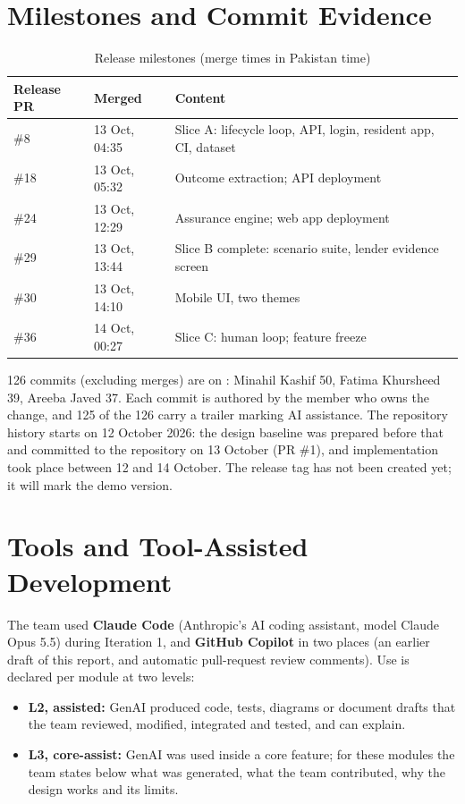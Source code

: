 \section{Milestones and Commit Evidence}\label{sec:milestones-commit-evidence}
\begin{table}[H]
\centering
\caption{Release milestones (merge times in Pakistan time)}\label{tab:release-milestones-merge-times}
\begin{tabular}{@{}L{81pt}L{124pt}L{170pt}@{}}
\toprule
Release PR & Merged & Content \\
\midrule
\#8 & 13 Oct, 04:35 & Slice A: lifecycle loop, API, login, resident app, CI, dataset \\
\#18 & 13 Oct, 05:32 & Outcome extraction; API deployment \\
\#24 & 13 Oct, 12:29 & Assurance engine; web app deployment \\
\#29 & 13 Oct, 13:44 & Slice B complete: scenario suite, lender evidence screen \\
\#30 & 13 Oct, 14:10 & Mobile UI, two themes \\
\#36 & 14 Oct, 00:27 & Slice C: human loop; feature freeze \\
\bottomrule
\end{tabular}
\end{table}
126 commits (excluding merges) are on : Minahil Kashif 50, Fatima Khursheed 39, Areeba Javed 37. Each commit is authored by the member who owns the change, and 125 of the 126 carry a  trailer marking AI assistance. The repository history starts on 12 October 2026: the design baseline was prepared before that and committed to the repository on 13 October (PR \#1), and implementation took place between 12 and 14 October. The release tag  has not been created yet; it will mark the demo version.

\section{Tools and Tool-Assisted Development}\label{sec:tools-tool-assisted-development}
The team used \textbf{Claude Code} (Anthropic's AI coding assistant, model Claude Opus 5.5) during Iteration 1, and \textbf{GitHub Copilot} in two places (an earlier draft of this report, and automatic pull-request review comments). Use is declared per module at two levels:

\begin{itemize}
\item \textbf{L2, assisted:} GenAI produced code, tests, diagrams or document drafts that the team reviewed, modified, integrated and tested, and can explain.
\item \textbf{L3, core-assist:} GenAI was used inside a core feature; for these modules the team states below what was generated, what the team contributed, why the design works and its limits.
\end{itemize}

